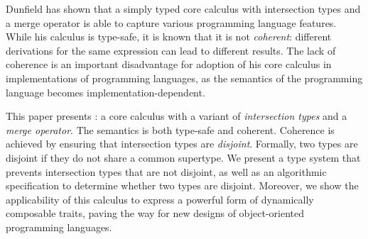 Dunfield has shown that a simply typed core calculus with intersection types and
a merge operator is able to capture various programming language features. While
his calculus is type-safe, it is known that it is not \emph{coherent}:
different derivations for the same expression can lead to different results. The
lack of coherence is an important disadvantage for adoption of his core calculus
in implementations of programming languages, as the semantics of the programming
language becomes implementation-dependent.

This paper presents \name: a core calculus with a variant of \emph{intersection
types} and a \emph{merge operator}. The semantics \name is both type-safe and
coherent. Coherence is achieved by ensuring that intersection types are
\emph{disjoint}. Formally, two types are disjoint if they do not share a common
supertype. We present a type system that prevents intersection types that are
not disjoint, as well as an algorithmic specification to determine whether two
types are disjoint. Moreover, we show the applicability of this calculus to
express a powerful form of dynamically composable traits, paving the way for new
designs of object-oriented programming languages.
